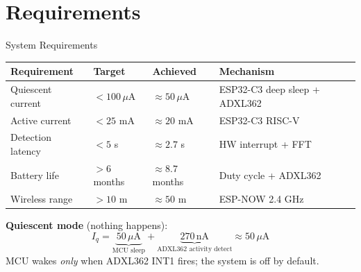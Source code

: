 \section{Requirements}

\begin{frame}{System Requirements}
\centering
\renewcommand{\arraystretch}{1.3}
\small
\begin{tabular}{p{3.0cm} >{\centering}p{1.8cm} >{\centering}p{1.8cm} p{2.8cm}}
\toprule
\textbf{Requirement} & \textbf{Target} & \textbf{Achieved} & \textbf{Mechanism} \\
\midrule
Quiescent current  & $<100\,\mu$A    & $\approx 50\,\mu$A  & ESP32-C3 deep sleep + ADXL362 \\
Active current     & $<25$ mA        & $\approx 20$ mA     & ESP32-C3 RISC-V              \\
Detection latency  & $<5$ s          & $\approx 2.7$ s     & HW interrupt + FFT           \\
Battery life       & $>6$ months     & $\approx 8.7$ months & Duty cycle + ADXL362 \\
Wireless range     & $>10$ m         & $\approx 50$ m      & ESP-NOW 2.4 GHz              \\
\bottomrule
\end{tabular}

\vspace{0.3em}
\normalsize\textbf{Quiescent mode} (nothing happens):
\[
  I_{q} = \underbrace{50\,\mu\text{A}}_{\text{MCU sleep}}
        + \underbrace{270\,\text{nA}}_{\text{ADXL362 activity detect}}
        \approx 50\,\mu\text{A}
\]
\vspace{-0.3em}
MCU wakes \emph{only} when ADXL362 INT1 fires; the system is off by default.
\end{frame}
